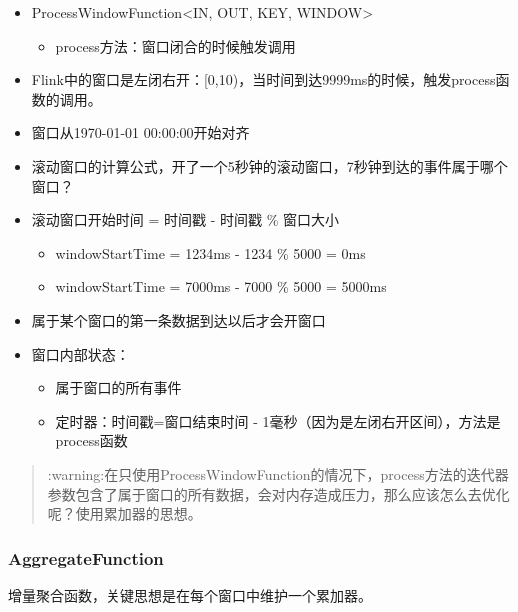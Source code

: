 \begin{itemize}
\tightlist
\item
  ProcessWindowFunction\textless IN, OUT, KEY, WINDOW\textgreater{}

  \begin{itemize}
  \tightlist
  \item
    process方法：窗口闭合的时候触发调用
  \end{itemize}
\item
  Flink中的窗口是左闭右开：{[}0,10)，当时间到达9999ms的时候，触发process函数的调用。
\item
  窗口从1970-01-01 00:00:00开始对齐
\item
  滚动窗口的计算公式，开了一个5秒钟的滚动窗口，7秒钟到达的事件属于哪个窗口？
\item
  滚动窗口开始时间 = 时间戳 - 时间戳 \% 窗口大小

  \begin{itemize}
  \tightlist
  \item
    windowStartTime = 1234ms - 1234 \% 5000 = 0ms
  \item
    windowStartTime = 7000ms - 7000 \% 5000 = 5000ms
  \end{itemize}
\item
  属于某个窗口的第一条数据到达以后才会开窗口
\item
  窗口内部状态：

  \begin{itemize}
  \tightlist
  \item
    属于窗口的所有事件
  \item
    定时器：时间戳=窗口结束时间 -
    1毫秒（因为是左闭右开区间），方法是process函数
  \end{itemize}
\end{itemize}

\begin{quote}
:warning:在只使用ProcessWindowFunction的情况下，process方法的迭代器参数包含了属于窗口的所有数据，会对内存造成压力，那么应该怎么去优化呢？使用累加器的思想。
\end{quote}

\hypertarget{aggregatefunction}{%
\subsubsection{AggregateFunction}\label{aggregatefunction}}

增量聚合函数，关键思想是在每个窗口中维护一个累加器。


